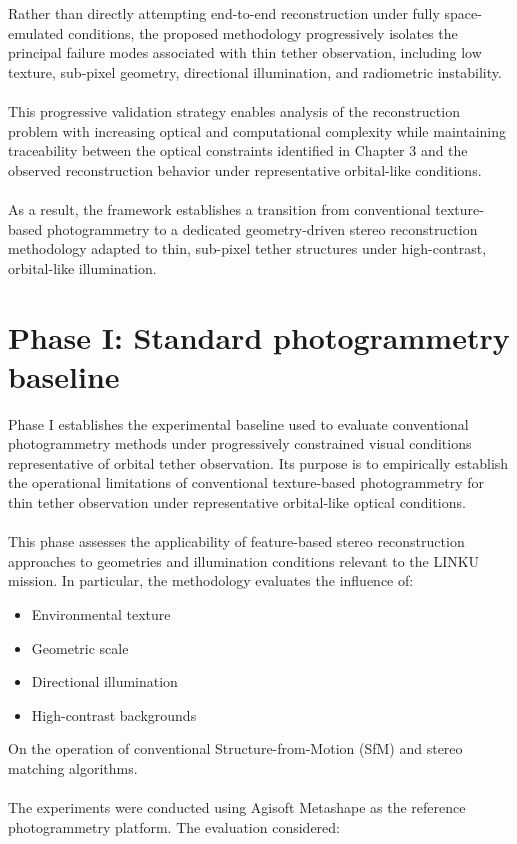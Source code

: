 Rather than directly attempting end-to-end reconstruction under fully space-emulated conditions, the proposed methodology progressively isolates the principal failure modes associated with thin tether observation, including low texture, sub-pixel geometry, directional illumination, and radiometric instability.
\\\\
This progressive validation strategy enables analysis of the reconstruction problem with increasing optical and computational complexity while maintaining traceability between the optical constraints identified in Chapter 3 and the observed reconstruction behavior under representative orbital-like conditions.
\\\\
As a result, the framework establishes a transition from conventional texture-based photogrammetry to a dedicated geometry-driven stereo reconstruction methodology adapted to thin, sub-pixel tether structures under high-contrast, orbital-like illumination.

\section{Phase I: Standard photogrammetry baseline}

Phase I establishes the experimental baseline used to evaluate conventional photogrammetry methods under progressively constrained visual conditions representative of orbital tether observation. Its purpose is to empirically establish the operational limitations of conventional texture-based photogrammetry for thin tether observation under representative orbital-like optical conditions.
\\\\
This phase assesses the applicability of feature-based stereo reconstruction approaches to geometries and illumination conditions relevant to the LINKU mission. In particular, the methodology evaluates the influence of:

\begin{itemize}
    \item Environmental texture
    \item Geometric scale
    \item Directional illumination
    \item High-contrast backgrounds
\end{itemize}

On the operation of conventional Structure-from-Motion (SfM) and stereo matching algorithms.
\\\\
The experiments were conducted using Agisoft Metashape as the reference photogrammetry platform. The evaluation considered:

